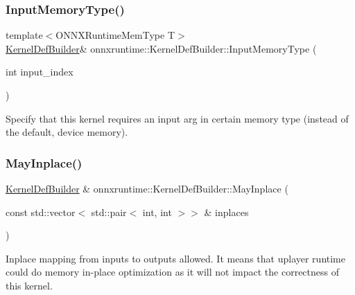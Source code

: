 \subsubsection{\texorpdfstring{Input\+Memory\+Type()}{InputMemoryType()}}
{\footnotesize\ttfamily template$<$O\+N\+N\+X\+Runtime\+Mem\+Type T$>$ \\
\mbox{\hyperlink{classonnxruntime_1_1KernelDefBuilder}{Kernel\+Def\+Builder}}\& onnxruntime\+::\+Kernel\+Def\+Builder\+::\+Input\+Memory\+Type (\begin{DoxyParamCaption}\item[{int}]{input\+\_\+index }\end{DoxyParamCaption})\hspace{0.3cm}{\ttfamily [inline]}}

Specify that this kernel requires an input arg in certain memory type (instead of the default, device memory). \mbox{\label{classonnxruntime_1_1KernelDefBuilder_a9748acafc76a7cba8a687609076b36b0}} 
\subsubsection{\texorpdfstring{May\+Inplace()}{MayInplace()}\hspace{0.1cm}{\footnotesize\ttfamily [1/2]}}
{\footnotesize\ttfamily \mbox{\hyperlink{classonnxruntime_1_1KernelDefBuilder}{Kernel\+Def\+Builder}} \& onnxruntime\+::\+Kernel\+Def\+Builder\+::\+May\+Inplace (\begin{DoxyParamCaption}\item[{const std\+::vector$<$ std\+::pair$<$ int, int $>$$>$ \&}]{inplaces }\end{DoxyParamCaption})}

Inplace mapping from inputs to outputs allowed. It means that uplayer runtime could do memory in-\/place optimization as it will not impact the correctness of this kernel. \mbox{\label{classonnxruntime_1_1KernelDefBuilder_a600587148ba45e668cbe5fca9324133f}} 

